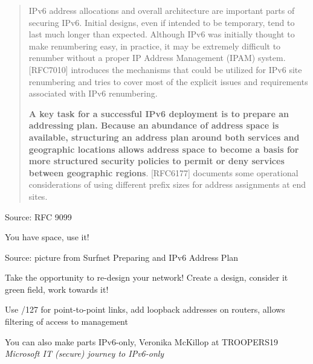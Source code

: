 \documentclass[Screen16to9,17pt]{foils}
\begin{document}
\begin{quote}
IPv6 address allocations and overall architecture are important parts
of securing IPv6.  Initial designs, even if intended to be temporary,
tend to last much longer than expected.  Although IPv6 was initially
thought to make renumbering easy, in practice, it may be extremely
difficult to renumber without a proper IP Address Management (IPAM)
system.  [RFC7010] introduces the mechanisms that could be utilized
for IPv6 site renumbering and tries to cover most of the explicit
issues and requirements associated with IPv6 renumbering.

{\bf A key task for a successful IPv6 deployment is to prepare an
addressing plan.  Because an abundance of address space is available,
structuring an address plan around both services and geographic
locations allows address space to become a basis for more structured
security policies to permit or deny services between geographic
regions}.  [RFC6177] documents some operational considerations of
using different prefix sizes for address assignments at end sites.
\end{quote}
Source: RFC 9099

\begin{list2}
\item You have space, use it!
\end{list2}



Source: picture from Surfnet Preparing and IPv6 Address Plan

\begin{list2}
\item Take the opportunity to re-design your network! Create a design, consider it green field, work towards it!
\item Use /127 for point-to-point links, add loopback addresses on routers, allows filtering of access to management
\item You can also make parts IPv6-only, Veronika McKillop at TROOPERS19 \emph{Microsoft IT (secure) journey to IPv6-only}\\
\end{list2}
\end{document}
